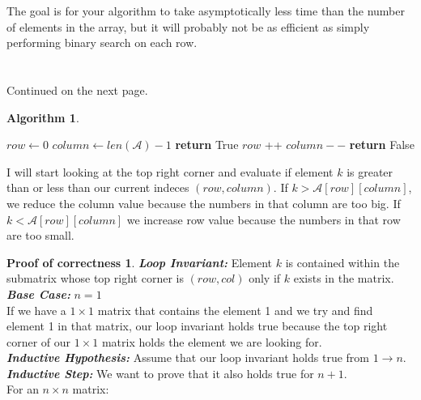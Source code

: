 \documentclass[11pt]{article}
\theoremstyle{definition}
\newtheorem*{algorithm}{Algorithm}
\newtheorem*{proofoc}{Proof of correctness}
\begin{document}
\begin{enumerate}
The goal is for your algorithm to take asymptotically less time than the number of elements 
in the array,  but it will probably not be as efficient as simply performing binary search on each row.
\\
\\
\\
Continued on the next page.
\newpage
\begin{algorithm}
    \item 
    \begin{algorithmic}[1]
         
        \State $row \gets 0$
        \State $column \gets len(\mathcal{A})-1$
                \State \textbf{return} True
                \State $row$ ++
            \Else 
                \State $column --$
            \EndIf
        \EndWhile
        \State \textbf{return} False
        \EndProcedure
    \end{algorithmic}
    I will start looking at the top right corner and evaluate if element $k$ is greater than or less than our current indeces $(row,column)$. If $k > \mathcal{A}[row][column]$, we reduce the column value because the numbers in that column are too big. 
    If $k < \mathcal{A}[row][column]$ we increase row value because the numbers in that row are too small. 
\end{algorithm}
\newpage
\begin{proofoc}
    \item 
    \textbf{\textit{Loop Invariant:} }Element $k$ is contained within the submatrix whose top right corner is $(row, col)$ only if $k$ exists in the matrix. \\[0.7em]
    \textbf{\textit{Base Case: }}$n=1$\\
    If we have a $1\times1$ matrix that contains the element 1 and we try and find element 1 in that matrix, our loop invariant holds true because 
    the top right corner of our $1 \times 1$ matrix holds the element we are looking for. \\[0.7em]
    \textbf{\textit{Inductive Hypothesis: }}Assume that our loop invariant holds true from $1 \rightarrow n$.\\[0.7em]
    \textbf{\textit{Inductive Step: }}We want to prove that it also holds true for $n+1$.\\
    For an $n \times n$ matrix: \\

\end{proofoc}
\end{enumerate}
\end{document}
